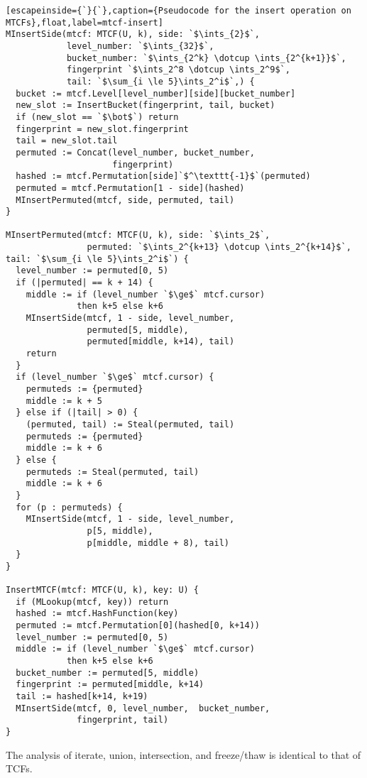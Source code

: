 \documentclass[letterpaper,twocolumn,10pt]{article}
\newcommand{\ints}{\mathbb{Z}}
\newcommand{\dotcup}{\ensuremath{\mathaccent\cdot\cup}}
\begin{document}
\begin{lstlisting}[escapeinside={`}{`},caption={Pseudocode for the insert operation on MTCFs},float,label=mtcf-insert]
MInsertSide(mtcf: MTCF(U, k), side: `$\ints_{2}$`,
            level_number: `$\ints_{32}$`,
            bucket_number: `$\ints_{2^k} \dotcup \ints_{2^{k+1}}$`,
            fingerprint `$\ints_2^8 \dotcup \ints_2^9$`,
            tail: `$\sum_{i \le 5}\ints_2^i$`,) {
  bucket := mtcf.Level[level_number][side][bucket_number]
  new_slot := InsertBucket(fingerprint, tail, bucket)
  if (new_slot == `$\bot$`) return
  fingerprint = new_slot.fingerprint
  tail = new_slot.tail
  permuted := Concat(level_number, bucket_number,
                     fingerprint)
  hashed := mtcf.Permutation[side]`$^\texttt{-1}$`(permuted)
  permuted = mtcf.Permutation[1 - side](hashed)
  MInsertPermuted(mtcf, side, permuted, tail)
}

MInsertPermuted(mtcf: MTCF(U, k), side: `$\ints_2$`,
                permuted: `$\ints_2^{k+13} \dotcup \ints_2^{k+14}$`, tail: `$\sum_{i \le 5}\ints_2^i$`) {
  level_number := permuted[0, 5)
  if (|permuted| == k + 14) {
    middle := if (level_number `$\ge$` mtcf.cursor)
              then k+5 else k+6
    MInsertSide(mtcf, 1 - side, level_number,
                permuted[5, middle),
                permuted[middle, k+14), tail)
    return
  }
  if (level_number `$\ge$` mtcf.cursor) {
    permuteds := {permuted}
    middle := k + 5
  } else if (|tail| > 0) {
    (permuted, tail) := Steal(permuted, tail)
    permuteds := {permuted}
    middle := k + 6
  } else {
    permuteds := Steal(permuted, tail)
    middle := k + 6
  }
  for (p : permuteds) {
    MInsertSide(mtcf, 1 - side, level_number,
                p[5, middle),
                p[middle, middle + 8), tail)
  }
}

InsertMTCF(mtcf: MTCF(U, k), key: U) {
  if (MLookup(mtcf, key)) return
  hashed := mtcf.HashFunction(key)
  permuted := mtcf.Permutation[0](hashed[0, k+14))
  level_number := permuted[0, 5)
  middle := if (level_number `$\ge$` mtcf.cursor)
            then k+5 else k+6
  bucket_number := permuted[5, middle)
  fingerprint := permuted[middle, k+14)
  tail := hashed[k+14, k+19)
  MInsertSide(mtcf, 0, level_number,  bucket_number,
              fingerprint, tail)
}
\end{lstlisting}

The analysis of iterate, union, intersection, and freeze/thaw is identical to that of TCFs.

\end{document}
